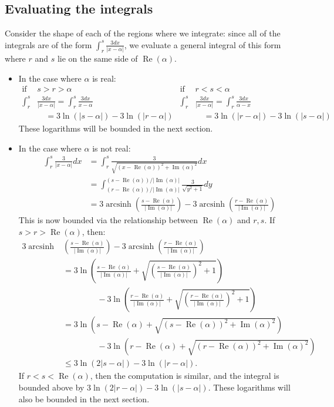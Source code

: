 \documentclass{amsart}
\theoremstyle{definition}
\DeclareMathOperator{\arcsinh}{arcsinh}
\DeclareMathOperator{\Real}{Re}
\DeclareMathOperator{\Imag}{Im}
\begin{document}
\subsection{Evaluating the integrals}
Consider the shape of each of the regions where we integrate: since all of the integrals are of the form $\int_r^s \frac{3dx}{|x-\alpha|}$, we evaluate a general integral of this form where $r$ and $s$ lie on the same side of $\Real(\alpha)$.
\begin{itemize}
\item In the case where $\alpha$ is real:
\begin{align*}
\text{if }&s>r>\alpha&\text{if }&r<s<\alpha\\
\int_r^s&\frac{3dx}{|x-\alpha|}=\int_r^s\frac{3dx}{x-\alpha}&\int_r^s&\frac{3dx}{|x-\alpha|}=\int_r^s\frac{3dx}{\alpha-x}\\
&\quad=3\ln(|s-\alpha|)-3\ln(|r-\alpha|)&&\quad=3\ln(|r-\alpha|)-3\ln(|s-\alpha|)
\end{align*}
These logarithms will be bounded in the next section.
\item In the case where $\alpha$ is not real:
\begin{align*}
\int_r^s\frac{3}{|x-\alpha|}dx&=\int_r^s\frac{3}{\sqrt{(x-\Real(\alpha))^2+\Imag(\alpha)^2}}dx\\
&=\int_{(r-\Real(\alpha))/|\Imag(\alpha)|}^{(s-\Real(\alpha))/|\Imag(\alpha)|}\frac{3}{\sqrt{y^2+1}}dy\\
&=3\arcsinh\left(\frac{s-\Real(\alpha)}{|\Imag(\alpha)|}\right)-3\arcsinh\left(\frac{r-\Real(\alpha)}{|\Imag(\alpha)|}\right)
\end{align*}
This is now bounded via the relationship between $\Real(\alpha)$ and $r,s$.  If $s>r>\Real(\alpha)$, then:
\begin{align*}
3\arcsinh&\left(\frac{s-\Real(\alpha)}{|\Imag(\alpha)|}\right)-3\arcsinh\left(\frac{r-\Real(\alpha)}{|\Imag(\alpha)|}\right)\\
&=3\ln\left(\frac{s-\Real(\alpha)}{|\Imag(\alpha)|}+\sqrt{\left(\frac{s-\Real(\alpha)}{|\Imag(\alpha)|}\right)^2+1}\right)\\
&\hspace{50pt}-3\ln\left(\frac{r-\Real(\alpha)}{|\Imag(\alpha)|}+\sqrt{\left(\frac{r-\Real(\alpha)}{|\Imag(\alpha)|}\right)^2+1}\right)\\
&=3\ln(s-\Real(\alpha)+\sqrt{(s-\Real(\alpha))^2+\Imag(\alpha)^2})\\
&\hspace{50pt}-3\ln(r-\Real(\alpha)+\sqrt{(r-\Real(\alpha))^2+\Imag(\alpha)^2})\\
&\leq3\ln(2|s-\alpha|)-3\ln(|r-\alpha|).
\end{align*}
If $r<s<\Real(\alpha)$, then the computation is similar, and the integral is bounded above by $3\ln(2|r-\alpha|)-3\ln(|s-\alpha|)$.  These logarithms will also be bounded in the next section.
\end{itemize}
\end{document}
